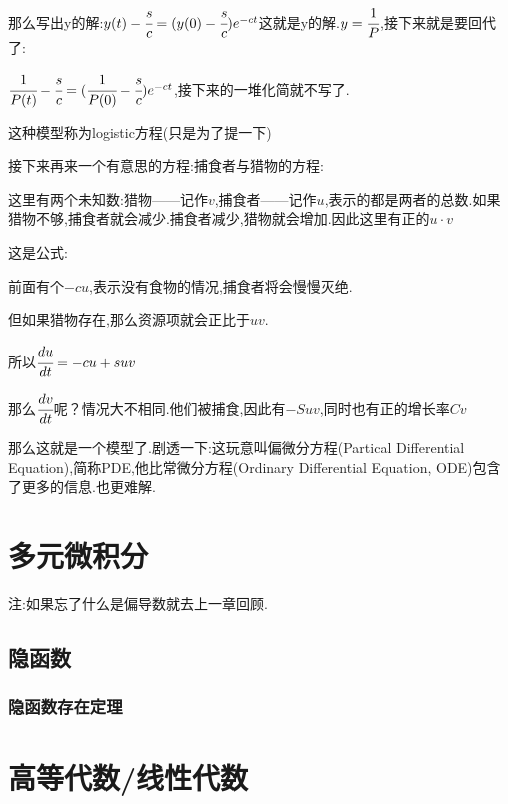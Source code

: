 \documentclass[UTF8,12pt]{ctexbook}
\begin{document}
{{{{  那么写出y的解:$y(t) - \cfrac{s}{c} = (y(0) - \cfrac{s}{c})e^{-ct}$这就是y的解.$y = \cfrac{1}{P}$,接下来就是要回代了:

  $\cfrac{1}{P(t)} - \cfrac{s}{c} = (\cfrac{1}{P(0)} - \cfrac{s}{c})e^{-ct}$,接下来的一堆化简就不写了.

  这种模型称为logistic方程(只是为了提一下)

  接下来再来一个有意思的方程:捕食者与猎物的方程:

  这里有两个未知数:猎物——记作$v$,捕食者——记作$u$,表示的都是两者的总数.如果猎物不够,捕食者就会减少.捕食者减少,猎物就会增加.因此这里有正的$u \cdot v$

  这是公式:

  前面有个$-cu$,表示没有食物的情况,捕食者将会慢慢灭绝.

  但如果猎物存在,那么资源项就会正比于$uv$.

  所以$\cfrac{du}{dt} = -cu + suv$

  那么$\cfrac{dv}{dt}$呢？情况大不相同.他们被捕食,因此有$-Suv$,同时也有正的增长率$Cv$

  那么这就是一个模型了.剧透一下:这玩意叫偏微分方程(Partical Differential Equation),简称PDE,他比常微分方程(Ordinary Differential Equation, ODE)包含了更多的信息.也更难解.

}%

}%

}%

\section{多元微积分}{
  注:如果忘了什么是偏导数就去上一章回顾.

  \subsection{隐函数}{

    \subsubsection{隐函数存在定理}{

    }%

  }%

 }%

\section{高等代数/线性代数}{

}}
\end{document}
